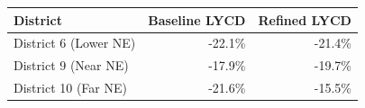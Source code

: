 \begin{tabularx}{\linewidth}{@{} Xrr @{}}
\toprule
District & Baseline LYCD & Refined LYCD \\
\midrule
District 6 (Lower NE) & -22.1\% & -21.4\% \\
District 9 (Near NE) & -17.9\% & -19.7\% \\
District 10 (Far NE) & -21.6\% & -15.5\% \\
\bottomrule
\end{tabularx}
